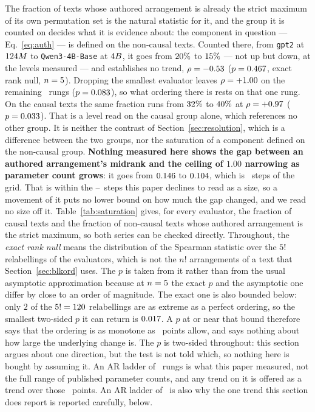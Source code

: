 The fraction of texts whose authored arrangement is already the strict
maximum of its own permutation set is the natural statistic for it, and the
group it is counted on decides what it is evidence about: the component in
question --- Eq.~\eqref{eq:auth} --- is defined on the non-causal texts.  Counted there, from \texttt{gpt2} at $124M$ to
\texttt{Qwen3-4B-Base} at $4B$, it goes from $20\%$ to
$15\%$ --- not up but down, at the levels measured --- and
establishes no trend, $\rho = -0.53$ ($p = 0.467$, exact
rank null, $n = 5$).  Dropping the smallest evaluator leaves
$\rho = +1.00$ on the remaining \TrendCeilNDropNEval\ rungs
($p = 0.083$), so what ordering there is rests on that one rung.  On the causal texts the same fraction runs from $32\%$ to
$40\%$ at $\rho = +0.97$ ($p = 0.033$).  That is a
level read on the causal group alone, which references no other group.  It
is neither the contrast of Section~\ref{sec:resolution}, which is a
difference between the two groups, nor the saturation of a component
defined on the non-causal group.  \textbf{Nothing measured here shows the gap between an authored
arrangement's midrank and the ceiling of $1.00$ narrowing as parameter
count grows}: it goes from $0.146$ to $0.104$, which is
\AuthoredCompSpanSteps\ steps of the grid.  That is within the
\CausalCompStepsMin--\CausalCompStepsMax\ steps this paper declines to
read as a size, so a movement of it puts no lower bound on how much
the gap changed, and we read no size off it.  Table~\ref{tab:saturation} gives, for every evaluator, the fraction of
causal texts and the fraction of non-causal texts whose authored
arrangement is the strict maximum, so both series can be checked
directly.  Throughout, the \emph{exact rank null} means the distribution of the
Spearman statistic over the $5!$ relabellings of the evaluators,
which is not the $n!$ arrangements of a text that Section~\ref{sec:blkord}
uses.  The $p$ is taken from it rather than from the usual asymptotic
approximation because at $n = 5$ the exact $p$ and the asymptotic
one differ by close to an order of magnitude.  The exact one is also bounded
below: only $2$ of the $5! = 120$ relabellings are as extreme as a
perfect ordering, so the smallest two-sided $p$ it can return is
$0.017$.  A $p$ at or near that bound therefore says that the
ordering is as monotone as \TrendNEval\ points allow, and says nothing about
how large the underlying change is.  The $p$ is two-sided throughout: this
section argues about one direction, but the test is not told which, so
nothing here is bought by assuming it.  An AR ladder of \TrendNEval\ rungs
is what this paper measured, not the full range of published parameter
counts, and any trend on it is offered as a trend over those
\TrendNEval\ points.  An AR ladder of \TrendNEval\ is also why the one trend this section does
report is reported carefully, below.

